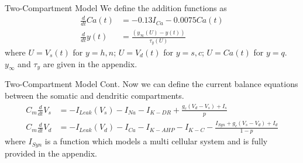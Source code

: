 \begin{frame}{Two-Compartment Model}
{    We define the addition functions as
    \begin{align*}
        \frac{d}{dt}Ca(t) &= -0.13I_{Ca}-0.0075Ca(t)\\
        \frac{d}{dt}y(t) &= \frac{(y_\infty(U)-y(t))}{\tau_y(U)}
    \end{align*}
    where $U=V_s(t)$ for $y=h,n$; $U=V_d(t)$ for $y=s,c$; $U=Ca(t)$ for $y=q$. $y_\infty$ and $\tau_y$ are given in the appendix.
    }
\end{frame}


\begin{frame}{Two-Compartment Model Cont.}
    Now we can define the current balance equations between the somatic and dendritic compartments. 
    \begin{align*}
    C_m\frac{d}{dt}V_s &= -I_{Leak}(V_s) - I_{Na} - I_{K-DR} + \frac{g_c(V_d-V_s) + I_s}{p}\\
    C_m\frac{d}{dt}V_d &= -I_{Leak}(V_d) - I_{Ca}- I_{K-AHP} - I_{K-C} - \frac{I_{Syn}+g_c(V_s-V_d)+I_d}{1-p}
    \end{align*}
    where $I_{Syn}$ is a function which models a multi cellular system and is fully provided in the appendix. 
\end{frame}
    
